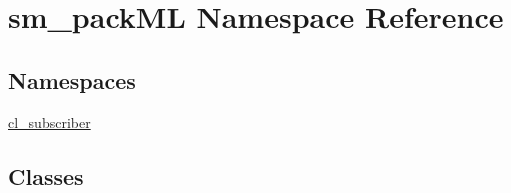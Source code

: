 \hypertarget{namespacesm__packML}{}\section{sm\+\_\+pack\+ML Namespace Reference}
\label{namespacesm__packML}
\subsection*{Namespaces}
\begin{DoxyCompactItemize}
\item 
 \hyperlink{namespacesm__packML_1_1cl__subscriber}{cl\+\_\+subscriber}
\end{DoxyCompactItemize}
\subsection*{Classes}
